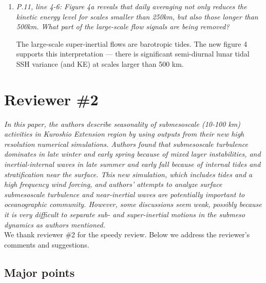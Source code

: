 \documentclass[11pt]{article}
\newcommand{\bdp}{\begin{description}}
\newcommand{\edp}{\end{description}}
\begin{document}
\begin{enumerate}
\item {\it P.11, line 4-6: Figure 4a reveals that daily averaging not only reduces the
      kinetic energy level for scales smaller than 250km, but also those longer
      than 500km. What part of the large-scale flow signals are being removed?}

  \bdp
  The large-scale super-inertial flows are barotropic tides. The new figure 4
  supports this interpretation --- there is significant semi-diurnal lunar
  tidal SSH variance (and KE) at scales larger than 500 km.
  \edp

\end{enumerate}

%
%

\section{Reviewer \#2}
{\it In this paper, the authors describe seasonality of submesoscale (10-100 km)
activities in Kuroshio Extension region by using outputs from their new high
resolution numerical simulations. Authors found that submesoscale turbulence
dominates in late winter and early spring because of mixed layer instabilities, and
inertial-internal waves in late summer and early fall because of internal tides and
stratification near the surface. This new simulation, which includes tides and a high
frequency wind forcing, and authors' attempts to analyze surface submesoscale
turbulence and near-inertial waves are potentially important to oceanographic
community. However, some discussions seem weak, possibly because it is very
difficult to separate sub- and super-inertial motions in the submeso dynamics as
authors mentioned.}\\

We thank reviewer \#2 for the speedy review. Below we address the reviewer’s
comments and suggestions.

\subsection{Major points}
\end{document}
